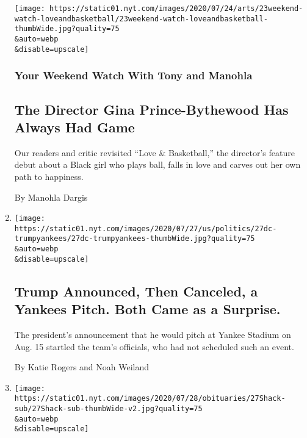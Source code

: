\begin{enumerate}
  \texttt{[image: https://static01.nyt.com/images/2020/07/24/arts/23weekend-watch-loveandbasketball/23weekend-watch-loveandbasketball-thumbWide.jpg?quality=75\\\&auto=webp\\\&disable=upscale]}

  \hypertarget{your-weekend-watch-with-tony-and-manohla}{%
  \subsubsection{Your Weekend Watch With Tony and
  Manohla}\label{your-weekend-watch-with-tony-and-manohla}}

  \hypertarget{the-director-gina-prince-bythewood-has-always-had-game}{%
  \subsection{The Director Gina Prince-Bythewood Has Always Had
  Game}\label{the-director-gina-prince-bythewood-has-always-had-game}}

  Our readers and critic revisited ``Love \& Basketball,'' the
  director's feature debut about a Black girl who plays ball, falls in
  love and carves out her own path to happiness.

  By Manohla Dargis
\item
  \href{/2020/07/27/us/politics/trump-yankees-fauci.html}{}

  \texttt{[image: https://static01.nyt.com/images/2020/07/27/us/politics/27dc-trumpyankees/27dc-trumpyankees-thumbWide.jpg?quality=75\\\&auto=webp\\\&disable=upscale]}

  \hypertarget{trump-announced-then-canceled-a-yankees-pitch-both-came-as-a-surprise}{%
  \subsection{Trump Announced, Then Canceled, a Yankees Pitch. Both Came
  as a
  Surprise.}\label{trump-announced-then-canceled-a-yankees-pitch-both-came-as-a-surprise}}

  The president's announcement that he would pitch at Yankee Stadium on
  Aug. 15 startled the team's officials, who had not scheduled such an
  event.

  By Katie Rogers and Noah Weiland
\item
  \href{/2020/07/27/sports/hockey/eddie-shack-feisty-wing-for-powerful-maple-leafs-dies-at-83.html}{}

  \texttt{[image: https://static01.nyt.com/images/2020/07/28/obituaries/27Shack-sub/27Shack-sub-thumbWide-v2.jpg?quality=75\\\&auto=webp\\\&disable=upscale]}


\end{enumerate}
